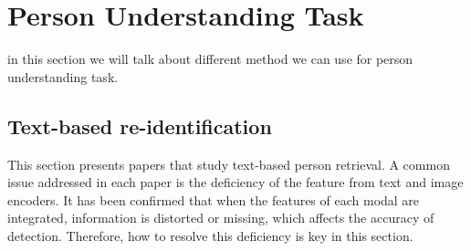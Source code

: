 \section{Person Understanding Task}
in this section we will talk about different method we can use for person understanding task. 

\subsection{Text-based re-identification}
This section presents papers that study text-based person retrieval. A common issue addressed in each paper is the deficiency of the feature from text and image encoders. It has been confirmed that when the features of each modal are integrated, information is distorted or missing, which affects the accuracy of detection. Therefore, how to resolve this deficiency is key in this section.


